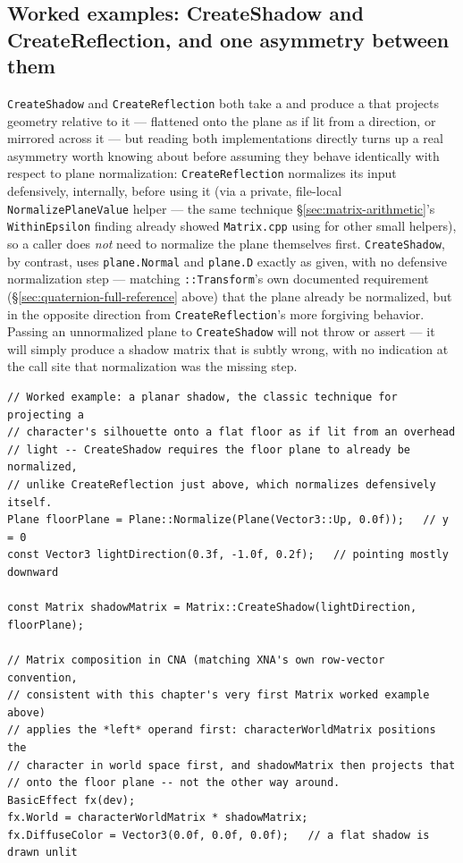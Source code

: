 \subsection{Worked examples: CreateShadow and CreateReflection, and one asymmetry between them}

\texttt{CreateShadow} and \texttt{CreateReflection} both take a  and produce a
 that projects geometry relative to it --- flattened onto the plane as if
lit from a direction, or mirrored across it --- but reading both implementations directly
turns up a real asymmetry worth knowing about before assuming they behave identically with
respect to plane normalization: \texttt{CreateReflection} normalizes its input 
defensively, internally, before using it (via a private, file-local
\texttt{NormalizePlaneValue} helper --- the same technique \S\ref{sec:matrix-arithmetic}'s
\texttt{WithinEpsilon} finding already showed \texttt{Matrix.cpp} using for other
small helpers), so a caller does \emph{not} need to normalize the plane themselves first.
\texttt{CreateShadow}, by contrast, uses \texttt{plane.Normal} and \texttt{plane.D} exactly as
given, with no defensive normalization step --- matching \texttt{::Transform}'s
own documented requirement (\S\ref{sec:quaternion-full-reference} above) that the plane already
be normalized, but in the opposite direction from \texttt{CreateReflection}'s more forgiving
behavior. Passing an unnormalized plane to \texttt{CreateShadow} will not throw or assert ---
it will simply produce a shadow matrix that is subtly wrong, with no indication at the call
site that normalization was the missing step.

\begin{lstlisting}
// Worked example: a planar shadow, the classic technique for projecting a
// character's silhouette onto a flat floor as if lit from an overhead
// light -- CreateShadow requires the floor plane to already be normalized,
// unlike CreateReflection just above, which normalizes defensively itself.
Plane floorPlane = Plane::Normalize(Plane(Vector3::Up, 0.0f));   // y = 0
const Vector3 lightDirection(0.3f, -1.0f, 0.2f);   // pointing mostly downward

const Matrix shadowMatrix = Matrix::CreateShadow(lightDirection, floorPlane);

// Matrix composition in CNA (matching XNA's own row-vector convention,
// consistent with this chapter's very first Matrix worked example above)
// applies the *left* operand first: characterWorldMatrix positions the
// character in world space first, and shadowMatrix then projects that
// onto the floor plane -- not the other way around.
BasicEffect fx(dev);
fx.World = characterWorldMatrix * shadowMatrix;
fx.DiffuseColor = Vector3(0.0f, 0.0f, 0.0f);   // a flat shadow is drawn unlit
\end{lstlisting}


